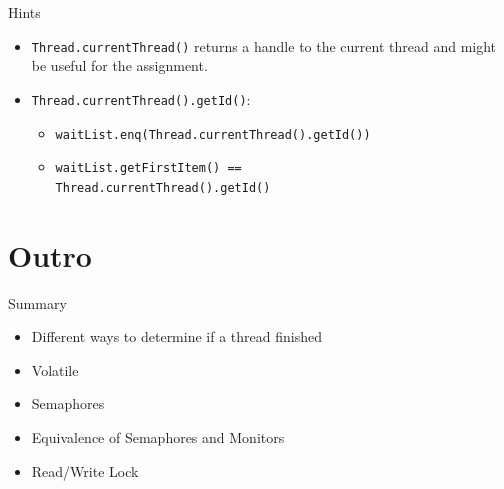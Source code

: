 \begin{frame}{Hints}
  \begin{itemize}
  \item \lstinline!Thread.currentThread()! returns a handle to the
    current thread and might be useful for the assignment.
  \item \lstinline!Thread.currentThread().getId()!:
    \begin{itemize}
    \item \lstinline!waitList.enq(Thread.currentThread().getId())!
    \item \lstinline!waitList.getFirstItem() == !\\
      \lstinline!Thread.currentThread().getId()!
    \end{itemize}
  \end{itemize}
\end{frame}


\section*{Outro}

\begin{frame}{Summary}
  \begin{itemize}
  \item Different ways to determine if a thread finished
  \item Volatile
  \item Semaphores
  \item Equivalence of Semaphores and Monitors
  \item Read/Write Lock
  \end{itemize}
\end{frame}


